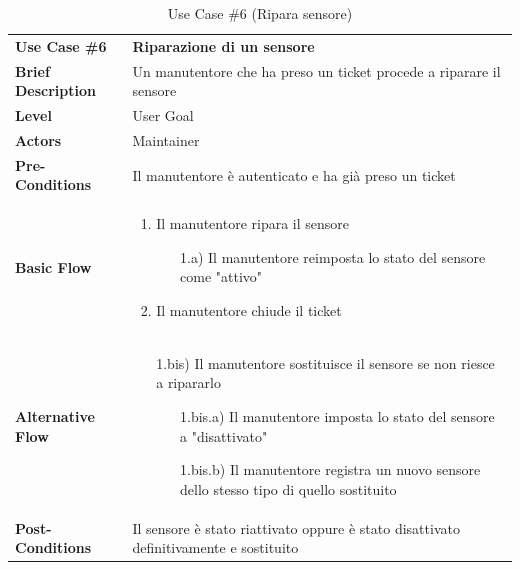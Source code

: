 	\begin{table}[h]
	\centering
	\setlength{\arrayrulewidth}{0.8pt} %
	
	\begin{tabular}{|l p{12cm}|}
		\hline
		
		\rowcolor{gray!25}
		\textbf{Use Case \#6} & \textbf{Riparazione di un sensore} \\ 
		\textbf{Brief Description} & Un manutentore che ha preso un ticket procede a riparare il sensore \\
		\textbf{Level} & User Goal \\ 
		\textbf{Actors} & Maintainer \\ 
		\textbf{Pre-Conditions} & Il manutentore è autenticato e ha già preso un ticket \\ 
		\textbf{Basic Flow} & \begin{enumerate}[label=\arabic*), leftmargin=*, before=\vspace{-0.7cm}, after=\vspace{-0.4cm}] 
			\item Il manutentore ripara il sensore  
			\begin{enumerate}[label=\arabic*), leftmargin=*, before=\vspace{-0.3cm}, after=\vspace{-0.3cm}]
				\item[1.a)] Il manutentore reimposta lo stato del sensore come "attivo"
			\end{enumerate} 
			\item Il manutentore chiude il ticket 
		\end{enumerate} \\
		\textbf{Alternative Flow} & \begin{enumerate}[label=\arabic*), before=\vspace{-0.7cm}, after=\vspace{-0.4cm}] 
			\item[1.bis)] Il manutentore sostituisce il sensore se non riesce a ripararlo 
			\begin{enumerate}[label=\arabic*), leftmargin=*, before=\vspace{-0.3cm}, after=\vspace{-0.3cm}]
				\item[1.bis.a)] Il manutentore imposta lo stato del sensore a "disattivato"
				\item[1.bis.b)] Il manutentore registra un nuovo sensore dello stesso tipo di quello sostituito
			\end{enumerate} 
		\end{enumerate} \\ 
		\textbf{Post-Conditions} & Il sensore è stato riattivato oppure è stato disattivato definitivamente e sostituito\\ 
		
		\hline
	\end{tabular}
	
	\vspace{0.2cm}
	\caption{Use Case \#6 (Ripara sensore)}
	\end{table}
	\vspace{1cm} 
	
